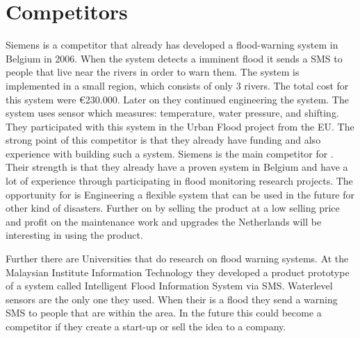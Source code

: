 \section{Competitors}
Siemens is a competitor that already has developed a flood-warning system in Belgium in 2006. When the system detects a imminent flood it sends a SMS to people that live near the rivers in order to warn them. The system is implemented in a small region, which consists of only 3 rivers. The total cost for this system were \euro{}230.000. Later on they continued engineering the system. The system uses sensor which measures: temperature, water pressure, and shifting. They participated with this system in the Urban Flood project from the EU. The strong point of this competitor is that they already have funding and also experience with building such a system. Siemens is the main competitor for \CompanyName{}. Their strength is that they already have a proven system in Belgium and have a lot of experience through participating in flood monitoring research projects. The opportunity for \CompanyName{} is Engineering a flexible system that can be used in the future for other kind of disasters. Further on by selling the product at a low selling price and profit on the maintenance work and upgrades the Netherlands will be interesting in using the product.

Further there are Universities that do research on flood warning systems. At the Malaysian Institute Information Technology they developed a product prototype of a system called Intelligent Flood Information System via SMS. Waterlevel sensors are the only one they used. When their is a flood they send a warning SMS to people that are within the area. In the future this could become a competitor if they create a start-up or sell the idea to a company.  



